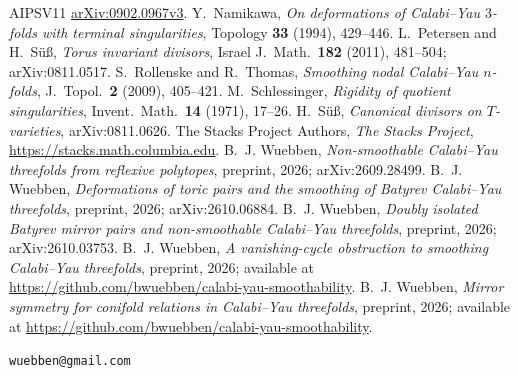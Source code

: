 \documentclass[11pt]{amsart}
\theoremstyle{definition}
\theoremstyle{remark}
\theoremstyle{plain}
\begin{document}
\begin{thebibliography}{AIPSV11}
\href{https://arxiv.org/abs/0902.0967v3}{arXiv:0902.0967v3}.
 Y.~Namikawa, \emph{On deformations of Calabi--Yau
$3$-folds with terminal singularities}, Topology \textbf{33} (1994), 429--446.
 L.~Petersen and H.~S\"u\ss, \emph{Torus invariant divisors},
Israel J.\ Math.\ \textbf{182} (2011), 481--504; arXiv:0811.0517.
 S.~Rollenske and R.~Thomas, \emph{Smoothing nodal
Calabi--Yau $n$-folds}, J.\ Topol.\ \textbf{2} (2009), 405--421.
 M.~Schlessinger, \emph{Rigidity of quotient
singularities}, Invent.\ Math.\ \textbf{14} (1971), 17--26.
 H.~S\"u\ss, \emph{Canonical divisors on
$T$-varieties}, arXiv:0811.0626.
 The Stacks Project Authors, \emph{The Stacks Project},
\url{https://stacks.math.columbia.edu}.
 B.~J. Wuebben, \emph{Non-smoothable Calabi--Yau
threefolds from reflexive polytopes}, preprint, 2026; arXiv:2609.28499.
 B.~J. Wuebben, \emph{Deformations of toric pairs and
the smoothing of Batyrev Calabi--Yau threefolds}, preprint, 2026; arXiv:2610.06884.
 B.~J. Wuebben, \emph{Doubly isolated Batyrev mirror
pairs and non-smoothable Calabi--Yau threefolds}, preprint, 2026; arXiv:2610.03753.
 B.~J. Wuebben, \emph{A vanishing-cycle obstruction to
smoothing Calabi--Yau threefolds}, preprint, 2026; available at
\url{https://github.com/bwuebben/calabi-yau-smoothability}.
 B.~J. Wuebben, \emph{Mirror symmetry for conifold
relations in Calabi--Yau threefolds}, preprint, 2026; available at
\url{https://github.com/bwuebben/calabi-yau-smoothability}.
\end{thebibliography}

\bigskip
{}
\texttt{wuebben@gmail.com}
\end{document}
